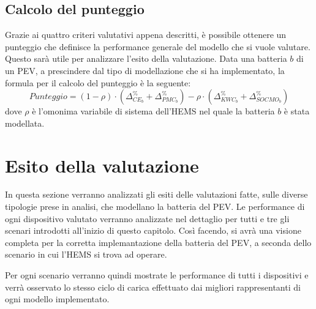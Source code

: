 \documentclass[italian, Lau, oneside]{sapthesis}
\begin{document}
\subsection{Calcolo del punteggio}
Grazie ai quattro criteri valutativi appena descritti, è possibile ottenere un punteggio che definisce la performance generale del modello che si vuole valutare. Questo sarà utile per analizzare l'esito della valutazione. Data una batteria $b$ di un PEV, a prescindere dal tipo di modellazione che si ha implementato, la formula per il calcolo del punteggio è la seguente:
\begin{equation}
    Punteggio = (1-\rho) \cdot (\Delta ^\%_{CE_b} + \Delta ^\%_{PMC_b}) - \rho \cdot (\Delta ^\%_{KWC_b} + \Delta ^\%_{SOCMO_b})
\end{equation}
dove $\rho$ è l'omonima variabile di sistema dell'HEMS nel quale la batteria $b$ è stata modellata.





\section{Esito della valutazione}
In questa sezione verranno analizzati gli esiti delle valutazioni fatte, sulle diverse tipologie prese in analisi, che modellano la batteria del PEV. Le performance di ogni dispositivo valutato verranno analizzate nel dettaglio per tutti e tre gli scenari introdotti all'inizio di questo capitolo. Così facendo, si avrà una visione completa per la corretta implemantazione della batteria del PEV, a seconda dello scenario in cui l'HEMS si trova ad operare. 

Per ogni scenario verranno quindi mostrate le performance di tutti i dispositivi e verrà osservato lo stesso ciclo di carica effettuato dai migliori rappresentanti di ogni modello implementato.
\end{document}
